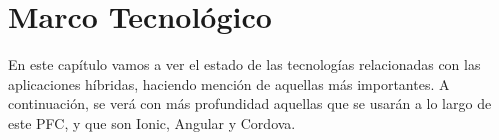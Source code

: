 \chapter{Marco Tecnológico}

En este capítulo vamos a ver el estado de las tecnologías relacionadas con las aplicaciones híbridas, haciendo mención de aquellas más importantes. A continuación, se verá con más profundidad aquellas que se usarán a lo largo de este \gls{PFC}, y que son Ionic, Angular y Cordova.
